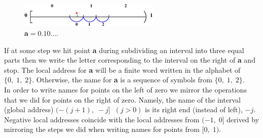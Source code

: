 \documentclass[color=black,11pt]{elegantpaper}
\begin{document}
\begin{figure}[htbp]
  \centering
  \includegraphics[width=0.6\textwidth]{xfig_stuff/3ZeroIntervalWith1Subdivided.eps}
  \caption{{\bf \color{red} a}$=0.10\dots.$} 
  \label{fig:3ZeroIntervalWith1Subdivided}
\end{figure}
If at some step we hit point {\bf \color{red} a} during subdividing an interval into three equal parts then we write the letter corresponding to the interval on the right of {\bf \color{red} a} and stop. The local address for {\bf \color{red} a} will be a finite word written in the alphabet of $\{0,\;1,\;2\}.$ Otherwise, the name for {\bf \color{red} a} is a sequence of symbols from $\{0,\;1,\;2\}.$\\

In order to write names for points on the left of zero we mirror the operations that we did for points on the right of zero. Namely, the name of the interval (global address) $(-(j+1),\;-j]\;\;(j>0)$ is its right end (instead of left), $-j.$ Negative local addresses coincide with the local addresses from $(-1,\;0]$ derived by mirroring the steps we did when writing names for points from $[0,\;1).$ \\
\end{document}
